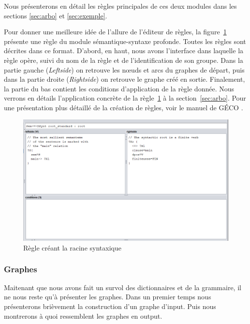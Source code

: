 Nous présenterons en détail les règles principales de ces deux modules dans les sections \ref{sec:arbo} et \ref{sec:exemple}. 

Pour donner une meilleure idée de l'allure de l'éditeur de règles, la figure~\ref{fig:root} présente une règle du module sémantique-syntaxe profonde. Toutes les règles sont décrites dans ce format. D'abord, en haut, nous avons l'interface dans laquelle la règle opère, suivi du nom de la règle et de l'identification de son groupe. Dans la partie gauche (\emph{Leftside}) on retrouve les n\oe{}uds et arcs du graphes de départ, puis dans la partie droite (\emph{Rightside}) on retrouve le graphe créé en sortie. Finalement, la partie du bas contient les conditions d'application de la règle donnée. Nous verrons en détails l'application concrète de la règle~\ref{fig:root} à la section~\ref{sec:arbo}. Pour une présentation plus détaillé de la création de règles, voir le manuel de GÉCO \citep{LambreyGECOv1User2016}.

\begin{figure}[htb]
	\centering
	\includegraphics[width=1\textwidth, trim = {0cm 0cm 0cm 0cm},clip]{ch3/figs/grammaire.png}
	\caption{Règle créant la racine syntaxique}
	\label{fig:root}
\end{figure}


\subsubsection{Graphes}\label{entree-sortie}

Maitenant que nous avons fait un survol des dictionnaires et de la grammaire, il ne nous reste qu'à présenter les graphes. Dans un premier temps nous présenterons brièvement la construction d'un graphe d'input. Puis nous montrerons à quoi ressemblent les graphes en output.

